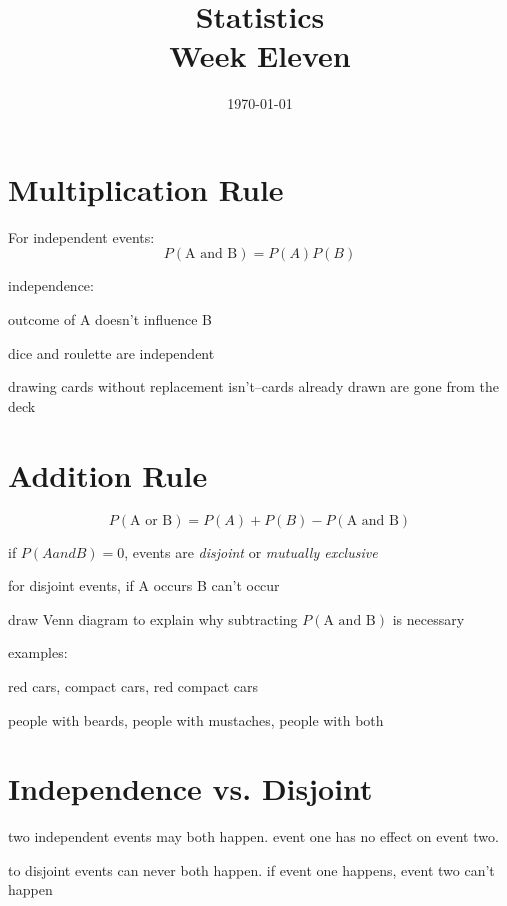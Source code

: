 \documentclass[landscape]{exam}
\title{Statistics \\ Week Eleven}
\date{\today}
\author{}
\begin{document}
  \maketitle
  \tableofcontents

  \section{Multiplication Rule}

  For independent events:
  \[
    P(\text{A and B}) = P(A) P(B)
  \]

  independence:
  \begin{itemize*}
    \item outcome of A doesn't influence B
    \item dice and roulette are independent
    \item drawing cards without replacement isn't--cards already drawn are gone
      from the deck
  \end{itemize*}

  \section{Addition Rule}

  \[
    P(\text{A or B}) = P(A) + P(B) - P(\text{A and B})
  \]

  \begin{itemize*}
    \item if $P(A and B) = 0$, events are {\em disjoint} or {\em mutually
      exclusive}
    \item for disjoint events, if A occurs B can't occur
    \item draw Venn diagram to explain why subtracting $P(\text{A and B})$ is
      necessary
  \end{itemize*}

  examples:
  \begin{itemize*}
    \item red cars, compact cars, red compact cars
    \item people with beards, people with mustaches, people with both
  \end{itemize*}

  \section{Independence vs. Disjoint}
  \begin{itemize*}
    \item two independent events may both happen. event one has no effect on
      event two.

    \item to disjoint events can never both happen. if event one happens, event
      two can't happen

  \end{itemize*}
\end{document}
